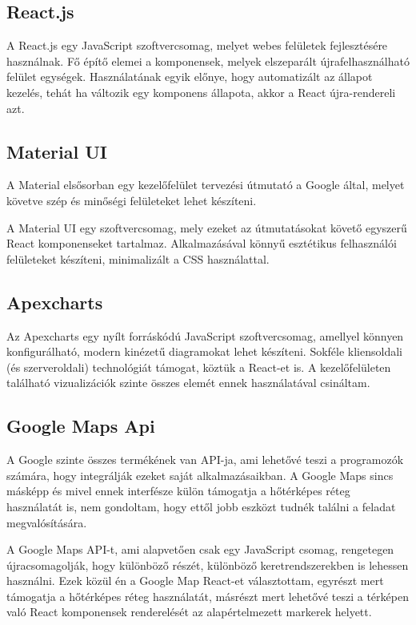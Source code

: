 \subsection{React.js}
A React.js \cite{react} egy JavaScript szoftvercsomag, melyet webes felületek fejlesztésére használnak.
Fő építő elemei a komponensek, melyek elszeparált újrafelhasználható felület egységek.
Használatának egyik előnye, hogy automatizált az állapot kezelés, tehát ha változik egy komponens állapota, akkor a React újra-rendereli azt.

\subsection{Material UI}
A Material \cite{material} elsősorban egy kezelőfelület tervezési útmutató a Google által, melyet követve szép és minőségi felületeket lehet készíteni.

A Material UI \cite{material-ui} egy szoftvercsomag, mely ezeket az útmutatásokat követő egyszerű React komponenseket tartalmaz.
Alkalmazásával könnyű esztétikus felhasználói felületeket készíteni, minimalizált a CSS használattal. 

\subsection{Apexcharts}
Az Apexcharts \cite{apexcharts} egy nyílt forráskódú JavaScript szoftvercsomag, amellyel könnyen konfigurálható, modern kinézetű diagramokat lehet készíteni.
Sokféle kliensoldali (és szerveroldali) technológiát támogat, köztük a React-et is. A kezelőfelületen található vizualizációk szinte összes elemét ennek használatával csináltam.

\subsection{Google Maps Api}
A Google szinte összes termékének van API-ja, ami lehetővé teszi a programozók számára, hogy integrálják ezeket saját alkalmazásaikban.
A Google Maps sincs másképp és mivel ennek interfésze külön támogatja a hőtérképes réteg használatát is, nem gondoltam, hogy ettől jobb eszközt tudnék találni a feladat megvalósítására.

A Google Maps API-t, ami alapvetően csak egy JavaScript csomag, rengetegen újracsomagolják, hogy különböző részét, különböző keretrendszerekben is lehessen használni.
Ezek közül én a Google Map React-et \cite{google-map-react} választottam, egyrészt mert támogatja a hőtérképes réteg használatát, 
másrészt mert lehetővé teszi a térképen való React komponensek renderelését az alapértelmezett markerek helyett.